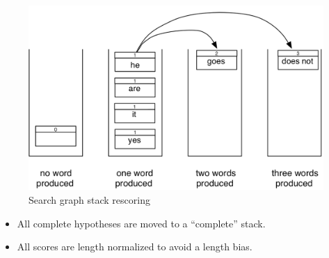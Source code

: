 \documentclass[landscape]{jhuslides3C}
\begin{document}
\begin{figure}
\begin{center}
\includegraphics[scale=0.3]{images/stack2.png}
\caption{Search graph stack rescoring}
\end{center}
\end{figure}
\begin{itemize}
\item All complete hypotheses are moved to a ``complete'' stack.
\item All scores are length normalized to avoid a length bias.
\end{itemize}
\end{document}
